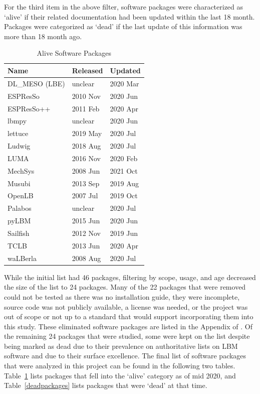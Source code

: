 \documentclass[final, 3p, times, authoryear]{elsarticle}
\begin{document}
For the third item in the above filter, software packages were characterized as
`alive' if their related documentation had been updated within the last 18
month. Packages were categorized as `dead' if the last update of this
information was more than 18 month ago.

\begin{table}
\begin{center}
	\begin{tabular}{ p{4cm}p{3cm}p{3cm} }
		\hline
		Name & Released & Updated\\
		\hline
		DL\_MESO (LBE) & unclear & 2020 Mar\\
		ESPResSo & 2010 Nov & 2020 Jun\\
		ESPResSo++ & 2011 Feb & 2020 Apr\\
		lbmpy& unclear  & 2020 Jun  \\
		lettuce & 2019 May & 2020 Jul\\
		Ludwig& 2018 Aug & 2020 Jul\\
		LUMA& 2016 Nov   & 2020 Feb\\
		MechSys & 2008 Jun    & 2021 Oct\\
		Musubi & 2013 Sep & 2019 Aug\\
		OpenLB & 2007 Jul & 2019 Oct\\
		Palabos & unclear & 2020 Jul\\
		pyLBM & 2015 Jun&   2020 Jun\\
		Sailfish & 2012 Nov & 2019 Jun\\
		TCLB & 2013 Jun  & 2020 Apr\\
		waLBerla & 2008 Aug & 2020 Jul\\
		\hline
	\end{tabular}
	\caption{Alive Software Packages} \label{alivepackages}
\end{center}
\end{table}

While the initial list had 46 packages, filtering by scope, usage, and age
decreased the size of the list to 24 packages. Many of the 22 packages that were
removed could not be tested as there was no installation guide, they were
incomplete, source code was not publicly available, a license was needed, or the
project was out of scope or not up to a standard that would support
incorporating them into this study. These eliminated software packages are
listed in the Appendix of \citet{Michalski2021}. Of the remaining 24 packages
that were studied, some were kept on the list despite being marked as dead due
to their prevalence on authoritative lists on LBM software and due to their
surface excellence.  The final list of software packages that were analyzed in
this project can be found in the following two tables. Table~\ref{alivepackages}
lists packages that fell into the `alive' category as of mid 2020, and
Table~\ref{deadpackages} lists packages that were `dead' at that time.
\end{document}
